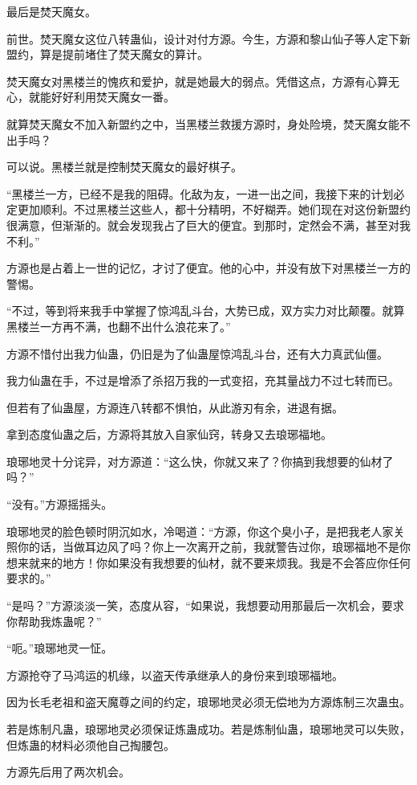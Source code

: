 \begin{this_body}
最后是焚天魔女。

前世。焚天魔女这位八转蛊仙，设计对付方源。今生，方源和黎山仙子等人定下新盟约，算是提前堵住了焚天魔女的算计。

焚天魔女对黑楼兰的愧疚和爱护，就是她最大的弱点。凭借这点，方源有心算无心，就能好好利用焚天魔女一番。

就算焚天魔女不加入新盟约之中，当黑楼兰救援方源时，身处险境，焚天魔女能不出手吗？

可以说。黑楼兰就是控制焚天魔女的最好棋子。

“黑楼兰一方，已经不是我的阻碍。化敌为友，一进一出之间，我接下来的计划必定更加顺利。不过黑楼兰这些人，都十分精明，不好糊弄。她们现在对这份新盟约很满意，但渐渐的。就会发现我占了巨大的便宜。到那时，定然会不满，甚至对我不利。”

方源也是占着上一世的记忆，才讨了便宜。他的心中，并没有放下对黑楼兰一方的警惕。

“不过，等到将来我手中掌握了惊鸿乱斗台，大势已成，双方实力对比颠覆。就算黑楼兰一方再不满，也翻不出什么浪花来了。”

方源不惜付出我力仙蛊，仍旧是为了仙蛊屋惊鸿乱斗台，还有大力真武仙僵。

我力仙蛊在手，不过是增添了杀招万我的一式变招，充其量战力不过七转而已。

但若有了仙蛊屋，方源连八转都不惧怕，从此游刃有余，进退有据。

拿到态度仙蛊之后，方源将其放入自家仙窍，转身又去琅琊福地。

琅琊地灵十分诧异，对方源道：“这么快，你就又来了？你搞到我想要的仙材了吗？”

“没有。”方源摇摇头。

琅琊地灵的脸色顿时阴沉如水，冷喝道：“方源，你这个臭小子，是把我老人家关照你的话，当做耳边风了吗？你上一次离开之前，我就警告过你，琅琊福地不是你想来就来的地方！你如果没有我想要的仙材，就不要来烦我。我是不会答应你任何要求的。”

“是吗？”方源淡淡一笑，态度从容，“如果说，我想要动用那最后一次机会，要求你帮助我炼蛊呢？”

“呃。”琅琊地灵一怔。

方源抢夺了马鸿运的机缘，以盗天传承继承人的身份来到琅琊福地。

因为长毛老祖和盗天魔尊之间的约定，琅琊地灵必须无偿地为方源炼制三次蛊虫。

若是炼制凡蛊，琅琊地灵必须保证炼蛊成功。若是炼制仙蛊，琅琊地灵可以失败，但炼蛊的材料必须他自己掏腰包。

方源先后用了两次机会。


\end{this_body}
